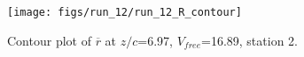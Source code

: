 \begin{figure}[H]
\centering
\texttt{[image: figs/run\_12/run\_12\_R\_contour]}
\caption{Contour plot of $\overline{r}$ at $z/c$=6.97, $V_{free}$=16.89, station 2.}
\label{fig:run_12_R_contour}
\end{figure}



